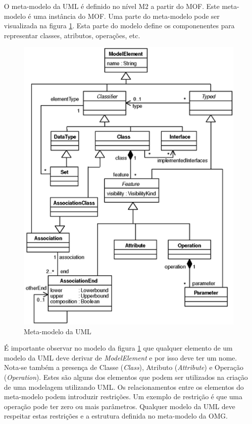 O meta-modelo da UML é definido no nível M2 a partir do MOF. Este meta-modelo é uma instância do MOF. Uma parte do meta-modelo pode ser visualizada na
figura \ref{fig:uml_meta_model}. Esta parte do modelo define os componenentes para representar classes, atributos, operações, etc.

\begin{figure}
	\centering
	\includegraphics{img/uml_meta_model.png}
	\caption{Meta-modelo da UML}\label{fig:uml_meta_model}
\end{figure}

É importante observar no modelo da figura \ref{fig:uml_meta_model} que qualquer elemento de um modelo da UML deve derivar de \textit{ModelElement} e
por isso deve ter um nome. Nota-se também a presença de Classe (\textit{Class}), Atributo (\textit{Attribute}) e Operação (\textit{Operation}). Estes
são alguns dos elementos que podem ser utilizados na criação de uma modelagem utilizando UML. Os relacionamentos entre os elementos do meta-modelo
podem introduzir restrições. Um exemplo de restrição é que uma operação pode ter zero ou mais parâmetros. Qualquer modelo da UML deve respeitar estas
restrições e a estrutura definida no meta-modelo da OMG.

